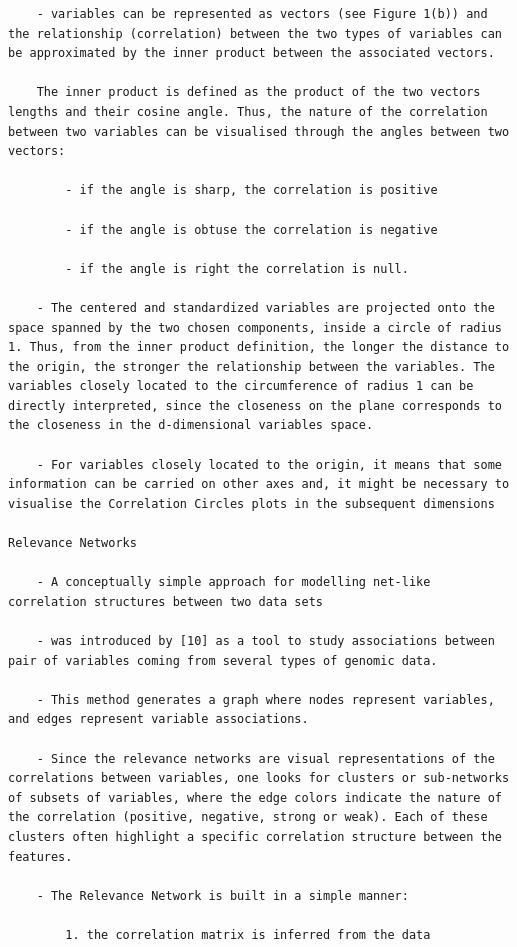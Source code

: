 \documentclass[
]{book}
\begin{document}
\begin{verbatim}
    - variables can be represented as vectors (see Figure 1(b)) and the relationship (correlation) between the two types of variables can be approximated by the inner product between the associated vectors.

    The inner product is defined as the product of the two vectors lengths and their cosine angle. Thus, the nature of the correlation between two variables can be visualised through the angles between two vectors:

        - if the angle is sharp, the correlation is positive

        - if the angle is obtuse the correlation is negative

        - if the angle is right the correlation is null.

    - The centered and standardized variables are projected onto the space spanned by the two chosen components, inside a circle of radius 1. Thus, from the inner product definition, the longer the distance to the origin, the stronger the relationship between the variables. The variables closely located to the circumference of radius 1 can be directly interpreted, since the closeness on the plane corresponds to the closeness in the d-dimensional variables space.

    - For variables closely located to the origin, it means that some information can be carried on other axes and, it might be necessary to visualise the Correlation Circles plots in the subsequent dimensions

Relevance Networks

    - A conceptually simple approach for modelling net-like correlation structures between two data sets

    - was introduced by [10] as a tool to study associations between pair of variables coming from several types of genomic data.

    - This method generates a graph where nodes represent variables, and edges represent variable associations.

    - Since the relevance networks are visual representations of the correlations between variables, one looks for clusters or sub-networks of subsets of variables, where the edge colors indicate the nature of the correlation (positive, negative, strong or weak). Each of these clusters often highlight a specific correlation structure between the features.

    - The Relevance Network is built in a simple manner:

        1. the correlation matrix is inferred from the data


\end{verbatim}
\end{document}
